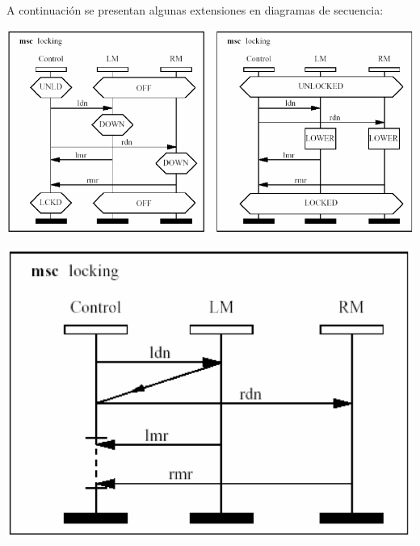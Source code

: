 \documentclass[]{article}
\begin{document}

A continuación se presentan algunas extensiones en diagramas de secuencia:
\begin{center}
	\includegraphics[scale=0.4]{CondEstados.png}
\end{center}

\begin{center}
	\includegraphics[scale=0.4]{CoRegOrd.png}
\end{center}
\end{document}
